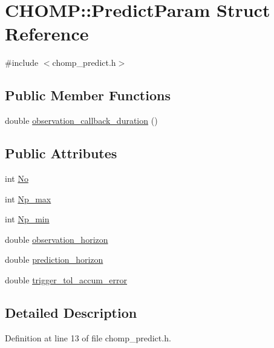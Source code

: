 \hypertarget{struct_c_h_o_m_p_1_1_predict_param}{}\section{C\+H\+O\+MP\+:\+:Predict\+Param Struct Reference}
\label{struct_c_h_o_m_p_1_1_predict_param}


{\ttfamily \#include $<$chomp\+\_\+predict.\+h$>$}

\subsection*{Public Member Functions}
\begin{DoxyCompactItemize}
\item 
double \hyperlink{struct_c_h_o_m_p_1_1_predict_param_ade19c94318f817105bf8b98725edb25f}{observation\+\_\+callback\+\_\+duration} ()
\end{DoxyCompactItemize}
\subsection*{Public Attributes}
\begin{DoxyCompactItemize}
\item 
int \hyperlink{struct_c_h_o_m_p_1_1_predict_param_a82c7cc8753b178ee7eee3ecb02960651}{No}
\item 
int \hyperlink{struct_c_h_o_m_p_1_1_predict_param_ab35ec9cff6cca550b5ba0b02a9b7b76c}{Np\+\_\+max}
\item 
int \hyperlink{struct_c_h_o_m_p_1_1_predict_param_a2f5cf53c69ea584acd95944b4fdd037f}{Np\+\_\+min}
\item 
double \hyperlink{struct_c_h_o_m_p_1_1_predict_param_ac11faa559b419145302aea082ded610e}{observation\+\_\+horizon}
\item 
double \hyperlink{struct_c_h_o_m_p_1_1_predict_param_a89a58ef3d9c88c23132ab5e7c64b9659}{prediction\+\_\+horizon}
\item 
double \hyperlink{struct_c_h_o_m_p_1_1_predict_param_a481fd775f165023e38e540757e0712ca}{trigger\+\_\+tol\+\_\+accum\+\_\+error}
\end{DoxyCompactItemize}


\subsection{Detailed Description}


Definition at line 13 of file chomp\+\_\+predict.\+h.




